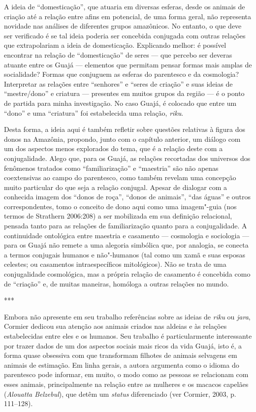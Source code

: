 A ideia de ``domesticação'', que atuaria em diversas esferas, desde os
animais de criação até a relação entre afins em potencial, de uma forma
geral, não representa novidade nas análises de diferentes grupos
amazônicos. No entanto, o que deve ser verificado é se tal ideia poderia
ser concebida conjugada com outras relações que extrapolariam a ideia de
domesticação. Explicando melhor: é possível encontrar na relação de
``domesticação'' de seres --- que percebo ser deveras atuante entre os Guajá
--- elementos que permitam pensar formas mais amplas de socialidade?
Formas que conjuguem as esferas do parentesco e da cosmologia?
Interpretar as relações entre ``senhores'' e ``seres de criação'' e suas
ideias de ``mestre/dono'' e criatura --- presentes em muitos grupos da
região --- é o ponto de partida para minha investigação. No caso Guajá, é
colocado que entre um ``dono'' e uma ``criatura'' foi estabelecida uma
relação, \emph{riku}.

Desta forma, a ideia aqui é também refletir sobre questões relativas à
figura dos donos na Amazônia, propondo, junto com o capítulo anterior,
um diálogo com um dos aspectos menos explorados do tema, que é a relação
deste com a conjugalidade. Alego que, para os Guajá, as relações
recortadas dos universos dos fenômenos tratados como ``familiarização'' e
``maestria'' são não apenas coextensivas ao campo do parentesco, como
também revelam uma concepção muito particular do que seja a relação
conjugal. Apesar de dialogar com a conhecida imagem dos ``donos de roça'',
``donos de animais'', ``das águas'' e outros correspondentes, tomo o
conceito de dono aqui como uma imagem"-guia (nos termos de Strathern
2006:208) a ser mobilizada em sua definição relacional, pensada tanto
para as relações de familiarização quanto para a conjugalidade. A
continuidade ontológica entre maestria e casamento --- cosmologia e
sociologia --- para os Guajá não remete a uma alegoria simbólica que, por
analogia, se conecta a termos conjugais humanos e não"-humanos (tal como
um xamã e suas esposas celestes; ou casamentos intraespecíficos
mitológicos). Não se trata de uma conjugalidade cosmológica, mas a
própria relação de casamento é concebida como de ``criação'' e, de muitas
maneiras, homóloga a outras relações no mundo.

\begin{center}
***
\end{center}

Embora não apresente em seu trabalho referências sobre as ideias de
\emph{riku} ou \emph{jara}, Cormier dedicou sua atenção aos animais
criados nas aldeias e às relações estabelecidas entre eles e os humanos.
Seu trabalho é particularmente interessante por trazer dados de um dos
aspectos sociais mais ricos da vida Guajá, isto é, a forma quase
obsessiva com que transformam filhotes de animais selvagens em animais
de estimação. Em linha gerais, a autora argumenta como o idioma do
parentesco pode informar, em muito, o modo como as pessoas se relacionam
com esses animais, principalmente na relação entre as mulheres e os
macacos capelães (\emph{Alouatta Belzebul}), que detêm um \emph{status}
diferenciado (ver Cormier, 2003, p. 111--128).

